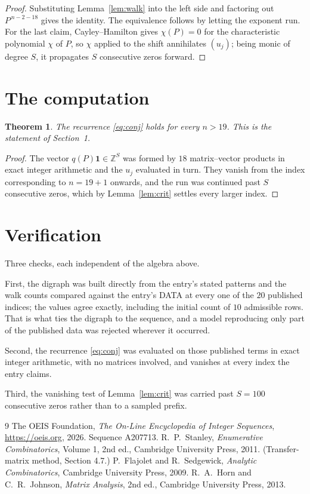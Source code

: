 \documentclass[11pt,a4paper]{article}
\theoremstyle{plain}
\newtheorem{theorem}{Theorem}
\theoremstyle{definition}
\begin{document}
\begin{proof}
Substituting Lemma~\ref{lem:walk} into the left side and factoring out
$P^{\,n-2-18}$ gives the identity. The equivalence follows by letting the exponent
run. For the last claim, Cayley--Hamilton gives $\chi(P)=0$ for the characteristic
polynomial $\chi$ of $P$, so $\chi$ applied to the shift annihilates $(u_j)$; being monic of
degree $S$, it propagates $S$ consecutive zeros forward.
\end{proof}

\section{The computation}

\begin{theorem}
The recurrence \eqref{eq:conj} holds for every $n>19$. This is the statement of
Section~1.
\end{theorem}

\begin{proof}
The vector $q(P)\mathbf{1}\in\mathbb{Z}^{S}$ was formed by $18$ matrix--vector
products in exact integer arithmetic and the $u_j$ evaluated in turn. They vanish from the
index corresponding to $n=19+1$ onwards, and the run was continued past $S$ consecutive
zeros, which by Lemma~\ref{lem:crit} settles every larger index.
\end{proof}

\section{Verification}

Three checks, each independent of the algebra above.

First, the digraph was built directly from the entry's stated patterns and the walk counts
compared against the entry's DATA at every one of the $20$ published indices; the
values agree exactly, including the initial count of $10$ admissible rows. That is
what ties the digraph to the sequence, and a model reproducing only part of the published
data was rejected wherever it occurred.

Second, the recurrence \eqref{eq:conj} was evaluated on those published terms in exact
integer arithmetic, with no matrices involved, and vanishes at every index the entry claims.

Third, the vanishing test of Lemma~\ref{lem:crit} was carried past $S=100$ consecutive
zeros rather than to a sampled prefix.

\begin{thebibliography}{9}
 The OEIS Foundation, \emph{The On-Line Encyclopedia of Integer
Sequences}, \url{https://oeis.org}, 2026. Sequence A207713.
 R.~P.~Stanley, \emph{Enumerative Combinatorics}, Volume 1, 2nd ed.,
Cambridge University Press, 2011. (Transfer-matrix method, Section 4.7.)
 P.~Flajolet and R.~Sedgewick, \emph{Analytic Combinatorics}, Cambridge
University Press, 2009.
 R.~A.~Horn and C.~R.~Johnson, \emph{Matrix Analysis}, 2nd ed., Cambridge
University Press, 2013.
\end{thebibliography}
\end{document}
